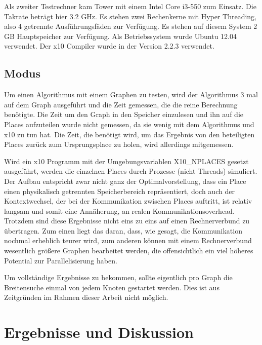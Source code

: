 Als zweiter Testrechner kam Tower mit einem Intel Core i3-550 zum Einsatz. Die Takrate beträgt hier 3.2 GHz. Es stehen zwei Rechenkerne mit Hyper Threading, also 4 getrennte Ausführungsfäden zur Verfügung. Es stehen auf diesem System 2 GB Hauptspeicher zur Verfügung. Als Betriebssystem wurde Ubuntu 12.04 verwendet. Der x10 Compiler wurde in der Version 2.2.3 verwendet. 

\section{Modus} %
\label{sec:modus}
Um einen Algorithmus mit einem Graphen zu testen, wird der Algorithmus 3 mal auf dem Graph ausgeführt und die Zeit gemessen, die die reine Berechnung benötigte. Die Zeit um den Graph in den Speicher einzulesen und ihn auf die Places aufzuteilen wurde nicht gemessen, da sie wenig mit dem Algorithmus und x10 zu tun hat. Die Zeit, die benötigt wird, um das Ergebnis von den beteiligten Places zurück zum Ursprungsplace zu holen, wird allerdings mitgemessen.

Wird ein x10 Programm mit der Umgebungsvariablen X10\_NPLACES gesetzt ausgeführt, werden die einzelnen Places durch Prozesse (nicht Threads) simuliert. Der Aufbau entspricht zwar nicht ganz der Optimalvorstellung, dass ein Place einen physikalisch getrennten Speicherbereich repräsentiert, doch auch der Kontextwechsel, der bei der Kommunikation zwischen Places auftritt, ist relativ langsam und somit eine Annäherung, an realen Kommunikationsoverhead. Trotzdem sind diese Ergebnisse nicht eins zu eins auf einen Rechnerverbund zu übertragen. Zum einen liegt das daran, dass, wie gesagt, die Kommunikation nochmal erheblich teurer wird, zum anderen können mit einem Rechnerverbund wesentlich größere Graphen bearbeitet werden, die offensichtlich ein viel höheres Potential zur Parallelisierung haben.

Um vollständige Ergebnisse zu bekommen, sollte eigentlich pro Graph die Breitensuche einmal von jedem Knoten gestartet werden. Dies ist aus Zeitgründen im Rahmen dieser Arbeit nicht möglich.       

\chapter{Ergebnisse und Diskussion} %
\label{cha:ergebnisse_und_diskussion}

